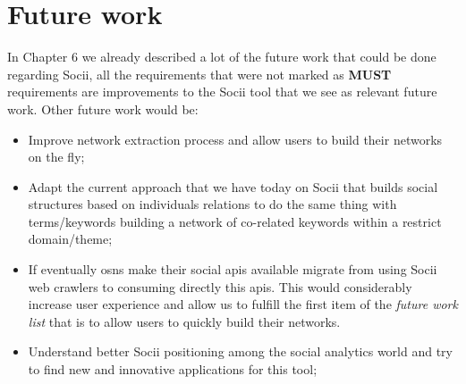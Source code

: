 \section{Future work}
In Chapter 6 we already described a lot of the future work that could be done regarding Socii, all the requirements that were not marked as \textbf{MUST} requirements
are improvements to the Socii tool that we see as relevant future work. Other future work would be:

\begin{itemize}
    \item Improve network extraction process and allow users to build their networks on the fly;
    \item Adapt the current approach that we have today on Socii that builds social structures based on individuals relations to do the same thing with terms/keywords
    building a network of co-related keywords within a restrict domain/theme;
    \item If eventually \glspl{osn} make their social \glspl{api} available migrate from using Socii web crawlers to consuming directly this \glspl{api}. This would
    considerably increase user experience and allow us to fulfill the first item of the \textit{future work list} that is to allow users to quickly build their networks.
    \item Understand better Socii positioning among the social analytics world and try to find new and innovative applications for this tool;
\end{itemize}


